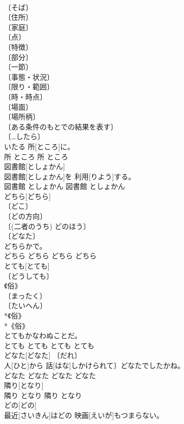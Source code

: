 \documentclass[8pt]{extreport}
\begin{document}
\begin{CJK}{UTF8}{min}
\\	〔そば〕 
\\	〔住所〕 
\\	〔家庭〕 
\\	〔点〕 
\\	〔特徴〕 
\\	〔部分〕 
\\	〔一節〕 
\\	〔事態・状況〕 
\\	〔限り・範囲〕 
\\	〔時・時点〕 
\\	〔場面〕 
\\	〔場所柄〕 
\\	〔ある条件のもとでの結果を表す〕 
\\	〔…したら〕 
\\	いたる 所[ところ]に。	
\\	所	ところ	所	ところ	
\\	図書館[としょかん]	
\\	図書館[としょかん]を 利用[りよう]する。	
\\	図書館	としょかん	図書館	としょかん	
\\	どちら[どちら]	
\\	〔どこ〕 
\\	〔どの方向〕 
\\	〔(二者のうち) どのほう〕 
\\	〔どなた〕 
\\	どちらかで。	
\\	どちら	どちら	どちら	どちら	
\\	とても[とても]	
\\	〔どうしても〕 
\\	《俗》 
\\	〔まったく〕 
\\	〔たいへん〕 
\\	*《俗》 
\\	*《俗》 
\\	とてもかなわぬことだ。	
\\	とても	とても	とても	とても	
\\	どなた[どなた]	〔だれ〕 
\\	人[ひと]から 話[はな]しかけられて〕どなたでしたかね。	
\\	どなた	どなた	どなた	どなた	
\\	隣り[となり]	
\\	隣り	となり	隣り	となり	
\\	どの[どの]	
\\	最近[さいきん]はどの 映画[えいが]もつまらない。	

\end{CJK}
\end{document}
